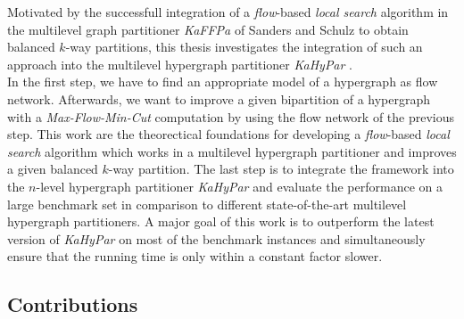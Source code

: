 Motivated by the successfull integration of a \emph{flow}-based \emph{local search} algorithm in the multilevel graph 
partitioner \emph{KaFFPa} of Sanders and Schulz \cite{sanders2011engineering} to obtain balanced $k$-way
partitions, this thesis investigates the integration of such an approach into the multilevel hypergraph
partitioner \emph{KaHyPar} \cite{heuer2017improving}.\\
In the first step, we have to find an appropriate model of a hypergraph as flow network. Afterwards, 
we want to improve a given bipartition of a hypergraph with a \emph{Max-Flow-Min-Cut} 
computation by using the flow network of the previous step.
This work are the theorectical foundations for developing a \emph{flow}-based \emph{local search} 
algorithm which works in a multilevel hypergraph partitioner and improves a given
balanced $k$-way partition. The last step is to integrate the framework into the
$n$-level hypergraph partitioner \emph{KaHyPar} \cite{heuer2017improving} and evaluate
the performance on a large benchmark set in comparison to different state-of-the-art 
multilevel hypergraph partitioners. A major goal of this work is to outperform the 
latest version of \emph{KaHyPar} on most of the benchmark instances and simultaneously
ensure that the running time is only within a constant factor slower.

\subsection{Contributions}

